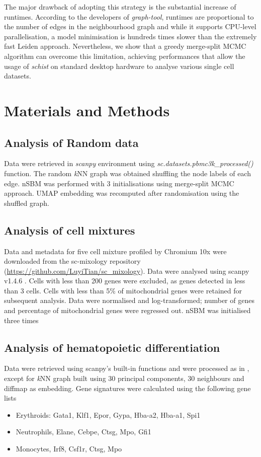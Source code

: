 \documentclass[10pt]{article}
\begin{document}
The major drawback of adopting this strategy is the substantial increase of runtimes. According to the developers of \emph{graph-tool}, runtimes are proportional to the number of edges in the neighbourhood graph and while it supports CPU-level parallelisation, a model minimisation is hundreds times slower than the extremely fast Leiden approach. Nevertheless, we show that a greedy merge-split MCMC algorithm can overcome this limitation, achieving performances that allow the usage of \emph{schist} on standard desktop hardware to analyse various single cell datasets.


\section*{Materials and Methods}

\subsection*{Analysis of Random data}
Data were retrieved in \emph{scanpy} environment using \emph{sc.datasets.pbmc3k\_processed()} function. The random \emph{k}NN graph was obtained shuffling the node labels of each edge. nSBM was performed with 3 initialisations using merge-split MCMC approach. UMAP embedding was recomputed after randomisation using the shuffled graph.


\subsection*{Analysis of cell mixtures}

Data and metadata for five cell mixture profiled by Chromium 10x were downloaded from the sc-mixology repository (\href{https://github.com/LuyiTian/sc_mixology}{https:/\slash github.com\slash LuyiTian\slash sc\_mixology}). Data were analysed using scanpy v1.4.6 \cite{wolf_2018}. Cells with less than 200 genes were excluded, as genes detected in less than 3 cells. Cells with less than 5\% of mitochondrial genes were retained for subsequent analysis. Data were normalised and log-transformed; number of genes and percentage of mitochondrial genes were regressed out. nSBM was initialised three times

\subsection*{Analysis of hematopoietic differentiation}

Data were retrieved using scanpy's built-in functions and were processed as in \cite{wolf_2019}, except for \emph{k}NN graph built using 30 principal components, 30 neighbours and diffmap as embedding. Gene signatures were calculated using the following gene lists
\begin{itemize}
\item Erythroids: Gata1, Klf1, Epor, Gypa, Hba-a2, Hba-a1, Spi1
\item Neutrophils, Elane, Cebpe, Ctsg, Mpo, Gfi1
\item Monocytes, Irf8, Csf1r, Ctsg, Mpo
\end{itemize}
\end{document}
